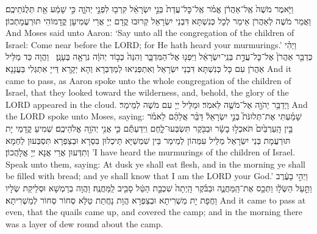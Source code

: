 {%
{וַיֹּ֤אמֶר מֹשֶׁה֙ אֶֽל־אַהֲרֹ֔ן אֱמֹ֗ר אֶֽל־כׇּל־עֲדַת֙ בְּנֵ֣י יִשְׂרָאֵ֔ל קִרְב֖וּ לִפְנֵ֣י יְהֹוָ֑ה כִּ֣י שָׁמַ֔ע אֵ֖ת תְּלֻנֹּתֵיכֶֽם׃
}
{וַאֲמַר מֹשֶׁה לְאַהֲרֹן אֵימַר לְכָל כְּנִשְׁתָּא דִּבְנֵי יִשְׂרָאֵל קְרוּבוּ קֳדָם יְיָ אֲרֵי שְׁמִיעָן קֳדָמוֹהִי תּוּרְעֲמָתְכוֹן׃}
{And Moses said unto Aaron: ‘Say unto all the congregation of the children of Israel: Come near before the LORD; for He hath heard your murmurings.’}{}
{וַיְהִ֗י כְּדַבֵּ֤ר אַהֲרֹן֙ אֶל־כׇּל־עֲדַ֣ת בְּנֵֽי־יִשְׂרָאֵ֔ל וַיִּפְנ֖וּ אֶל־הַמִּדְבָּ֑ר וְהִנֵּה֙ כְּב֣וֹד יְהֹוָ֔ה נִרְאָ֖ה בֶּעָנָֽן׃ \petucha }
{וַהֲוָה כַּד מַלֵּיל אַהֲרֹן עִם כָּל כְּנִשְׁתָּא דִּבְנֵי יִשְׂרָאֵל וְאִתְפְּנִיאוּ לְמַדְבְּרָא וְהָא יְקָרָא דַּייָ אִתְגְּלִי בַּעֲנָנָא׃}
{And it came to pass, as Aaron spoke unto the whole congregation of the children of Israel, that they looked toward the wilderness, and, behold, the glory of the LORD appeared in the cloud.}{}
{וַיְדַבֵּ֥ר יְהֹוָ֖ה אֶל־מֹשֶׁ֥ה לֵּאמֹֽר׃}
{וּמַלֵּיל יְיָ עִם מֹשֶׁה לְמֵימַר׃}
{And the LORD spoke unto Moses, saying:}{}
{שָׁמַ֗עְתִּי אֶת־תְּלוּנֹּת֮ בְּנֵ֣י יִשְׂרָאֵל֒ דַּבֵּ֨ר אֲלֵהֶ֜ם לֵאמֹ֗ר בֵּ֤ין הָֽעַרְבַּ֙יִם֙ תֹּאכְל֣וּ בָשָׂ֔ר וּבַבֹּ֖קֶר תִּשְׂבְּעוּ־לָ֑חֶם וִֽידַעְתֶּ֕ם כִּ֛י אֲנִ֥י יְהֹוָ֖ה אֱלֹהֵיכֶֽם׃}
{שְׁמִיעַ קֳדָמַי יָת תּוּרְעֲמָת בְּנֵי יִשְׂרָאֵל מַלֵּיל עִמְּהוֹן לְמֵימַר בֵּין שִׁמְשַׁיָּא תֵּיכְלוּן בִּסְרָא וּבְצַפְרָא תִּסְבְּעוּן לַחְמָא וְתִדְּעוּן אֲרֵי אֲנָא יְיָ אֱלָהֲכוֹן׃}
{’I have heard the murmurings of the children of Israel. Speak unto them, saying: At dusk ye shall eat flesh, and in the morning ye shall be filled with bread; and ye shall know that I am the LORD your God.’}{}
{וַיְהִ֣י בָעֶ֔רֶב וַתַּ֣עַל הַשְּׂלָ֔ו וַתְּכַ֖ס אֶת־הַֽמַּחֲנֶ֑ה וּבַבֹּ֗קֶר הָֽיְתָה֙ שִׁכְבַ֣ת הַטַּ֔ל סָבִ֖יב לַֽמַּחֲנֶֽה׃
}
{וַהֲוָה בְרַמְשָׁא וּסְלֵיקַת שְׂלָיו וַחֲפָת יָת מַשְׁרִיתָא וּבְצַפְרָא הֲוָת נָחֲתַת טַלָּא סְחוֹר סְחוֹר לְמַשְׁרִיתָא׃}
{And it came to pass at even, that the quails came up, and covered the camp; and in the morning there was a layer of dew round about the camp.}{}
}
